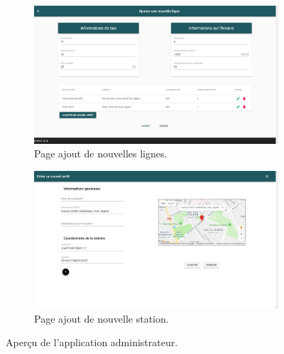 \begin{figure}[h!]
	 \begin{subfigure}[b]{\linewidth}
	 	\includegraphics[width=\linewidth]{img/spuf/addline.png}
	 	\caption{Page ajout de nouvelles lignes.}
	 \end{subfigure}
	 
	 \begin{subfigure}[b]{\linewidth}
	 	\includegraphics[width=\linewidth]{img/spuf/createstation.png}
	 	\caption{Page ajout de nouvelle station.}	 
	 \end{subfigure}
	 \caption{Aperçu de l'application administrateur.}
\end{figure}